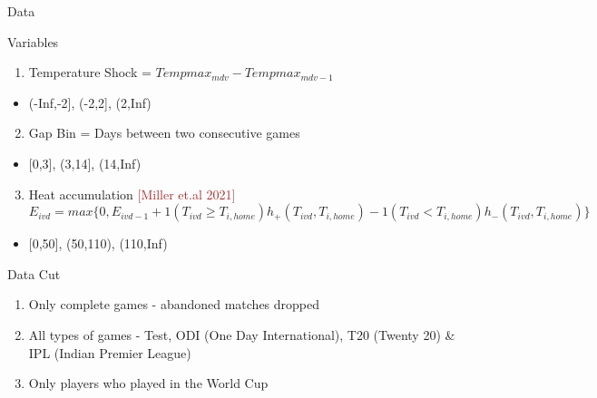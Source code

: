 \documentclass[
  10pt,
  ignorenonframetext,
  twocolumn]{beamer}
\providecommand{\tightlist}{%
  \setlength{\itemsep}{0pt}\setlength{\parskip}{0pt}}
\begin{document}
\begin{frame}{Data}
\protect\hypertarget{data-2}{}
\begin{block}{Variables}
\protect\hypertarget{variables}{}
\begin{enumerate}
\tightlist
\item
  Temperature Shock = \(Tempmax_{mdv} - Tempmax_{mdv-1}\)
\end{enumerate}

\begin{itemize}
\tightlist
\item
  (-Inf,-2{]}, (-2,2{]}, (2,Inf)
\end{itemize}

\begin{enumerate}
\setcounter{enumi}{1}
\tightlist
\item
  Gap Bin = Days between two consecutive games
\end{enumerate}

\begin{itemize}
\tightlist
\item
  {[}0,3{]}, (3,14{]}, (14,Inf)
\end{itemize}

\begin{enumerate}
\setcounter{enumi}{2}
\tightlist
\item
  Heat accumulation \textcolor{brown}{[Miller et.al 2021]}\\
  \(E_{ivd} = max\{0,E_{ivd-1} + 1(T_{ivd} \geq T_{i,home})h_{+}(T_{ivd},T_{i,home}) -1(T_{ivd}<T_{i,home})h_{-}(T_{ivd},T_{i,home}) \}\)
\end{enumerate}

\begin{itemize}
\tightlist
\item
  {[}0,50{]}, (50,110), (110,Inf)
\end{itemize}
\end{block}

\begin{block}{Data Cut}
\protect\hypertarget{data-cut}{}
\begin{enumerate}
\item
  Only complete games - abandoned matches dropped
\item
  All types of games - Test, ODI (One Day International), T20 (Twenty
  20) \& IPL (Indian Premier League)
\item
  Only players who played in the World Cup
\end{enumerate}
\end{block}
\end{frame}
\end{document}
